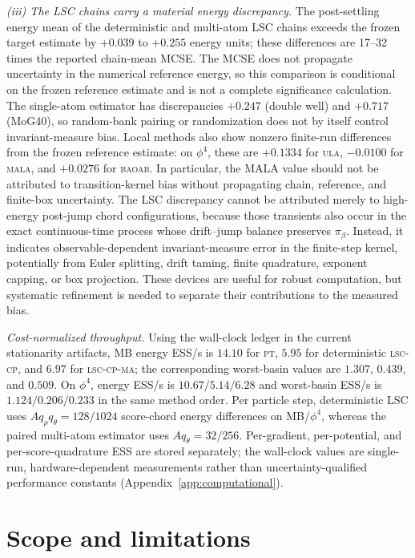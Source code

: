 \documentclass[11pt]{article}
\newcommand{\piB}{\pi_\beta}
\begin{document}
\emph{(iii) The LSC chains carry a material energy discrepancy.}
The post-settling energy mean of the deterministic and multi-atom LSC chains
exceeds the frozen target estimate by $+0.039$ to $+0.255$ energy units; these
differences are 17--32 times the reported chain-mean MCSE.  The MCSE does not
propagate uncertainty in the numerical reference energy, so this comparison is
conditional on the frozen reference estimate and is not a complete
significance calculation.  The single-atom estimator has discrepancies
$+0.247$ (double well) and $+0.717$ (MoG40), so random-bank pairing or
randomization does not by itself control invariant-measure bias.
Local methods also show nonzero finite-run differences from the frozen
reference estimate: on $\phi^4$, these are $+0.1334$ for \textsc{ula},
$-0.0100$ for \textsc{mala}, and $+0.0276$ for \textsc{baoab}.  In particular,
the MALA value should not be attributed to transition-kernel bias without
propagating chain, reference, and finite-box uncertainty.  The LSC discrepancy
cannot be attributed merely to
high-energy post-jump chord configurations, because those transients also
occur in the exact continuous-time process whose drift--jump balance preserves
$\piB$.  Instead, it indicates observable-dependent invariant-measure error
in the finite-step kernel, potentially from Euler splitting, drift taming,
finite quadrature, exponent capping, or box projection.  These devices are
useful for robust computation, but systematic refinement is needed to
separate their contributions to the measured bias.

\emph{Cost-normalized throughput.}
Using the wall-clock ledger in the current stationarity artifacts, MB energy
ESS/s is $14.10$ for \textsc{pt}, $5.95$ for deterministic \textsc{lsc-cp},
and $6.97$ for \textsc{lsc-cp-ma}; the corresponding worst-basin values are
$1.307$, $0.439$, and $0.509$.  On $\phi^4$, energy ESS/s is
$10.67/5.14/6.28$ and worst-basin ESS/s is $1.124/0.206/0.233$ in the same
method order.  Per particle step, deterministic LSC uses
$Aq_\rho q_\theta=128/1024$ score-chord energy differences on MB/$\phi^4$,
whereas the paired multi-atom estimator uses $Aq_\theta=32/256$.
Per-gradient, per-potential, and per-score-quadrature ESS are stored
separately; the wall-clock values are single-run, hardware-dependent
measurements rather than uncertainty-qualified performance constants
(Appendix~\ref{app:computational}).

\section{Scope and limitations}
\label{sec:outlook}
\end{document}
